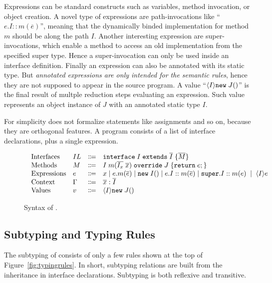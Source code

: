 Expressions can be standard constructs such as variables, method
invocation, or object creation. A novel type of expressions are path-invocations like
``$e.I::m(\overline{e})$'', meaning that the dynamically binded
implementation for method $m$ should be along the path $I$. Another
interesting expression are super-invocations, which enable a method to access an old
implementation from the specified super type. Hence a super-invocation
can only be used inside an interface definition.
Finally an expression can also be annotated with its static type. But \emph{annotated expressions are only intended for the semantic rules},
hence they are not supposed to appear in the source program. A value
``$\langle I \rangle\texttt{new} \; J()$''
is the final result of multple reduction steps evaluating an
expression. Such value represents an object instance
of $J$ with an annotated static type $I$.

For simplicity \name{} does not formalize statements like assignments and so on, because they are orthogonal features.
A program consists of a list of interface declarations, plus a single expression.

\begin{figure*}[t]
\begin{displaymath}
\begin{array}{l}
\begin{array}{llrl}
\text{Interfaces}   & IL & \Coloneqq & \texttt{interface} \; I \; \texttt{extends} \; \overline{I} \; {\{} \overline{M} {\}} \\
\text{Methods}      & M  & \Coloneqq & I \; m (\overline{I_x} \; \overline{x}) \; \texttt{override} \; J \; {\{} \texttt{return} \; e ; {\}} \\
\text{Expressions}  & e  & \Coloneqq & x \mid
e.m(\overline{e}) \mid
\texttt{new} \; I() \mid
e.I::m(\overline{e}) \mid
\texttt{super}.I::m(e) \; \mid \; \langle I \rangle e \\
\text{Context}      & \Gamma & \Coloneqq & \overline{x}:\overline{I} \\
\text{Values}       & v & \Coloneqq & \langle I \rangle \texttt{new} \; J() \\
\end{array}
\end{array}
\end{displaymath}
\caption{Syntax of \name{}.}\label{fig:syntax}
\end{figure*}

\subsection{Subtyping and Typing Rules}
The subtyping of \MIM{} consists of only a few rules shown at the top of Figure~\ref{fig:typingrules}.
In short, subtyping relations are built from the inheritance in interface
declarations. Subtyping is both reflexive and transitive.

